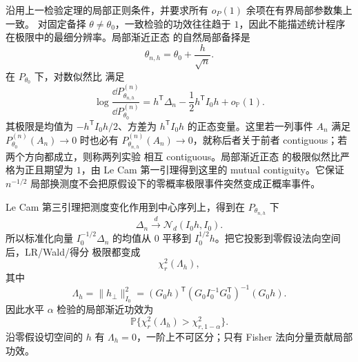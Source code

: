 \begin{proposition}[局部备择的非中心卡方与功效]
沿用上一检验定理的局部正则条件，并要求所有 $o_P(1)$ 余项在有界局部参数集上一致。
对固定备择 $\theta\ne\theta_0$，一致检验的功效往往趋于 $1$，因此不能描述统计程序在极限中的最细分辨率。局部渐近正态 的自然局部备择是
\[
 \theta_{n,h}
 =\theta_0+\frac h{\sqrt n}.
\]
在 $P_{\theta_0}$ 下，对数似然比 满足
\[
 \log\frac{\dd P_{\theta_{n,h}}^{(n)}}
 {\dd P_{\theta_0}^{(n)}}
 =h^{\mathsf T}\Delta_n
 -\frac12h^{\mathsf T}I_0h
 +o_{\mathbb P}(1).
\]
其极限是均值为 $-h^{\mathsf T}I_0h/2$、方差为 $h^{\mathsf T}I_0h$ 的正态变量。这里若一列事件 $A_n$ 满足 $P_{\theta_0}^{(n)}(A_n)\to0$ 时也必有 $P_{\theta_{n,h}}^{(n)}(A_n)\to0$，就称后者关于前者 contiguous；若两个方向都成立，则称两列实验 相互 contiguous。局部渐近正态 的极限似然比严格为正且期望为 $1$，由 Le Cam 第一引理得到这里的 mutual contiguity。它保证 $n^{-1/2}$ 局部换测度不会把原假设下的零概率极限事件突然变成正概率事件。

Le Cam 第三引理把测度变化作用到中心序列上，得到在 $P_{\theta_{n,h}}$ 下
\begin{equation}\label{eq:math-stat-third-lemma-shift}
 \Delta_n
 \xrightarrow{d}\mathcal N_d(I_0h,I_0).
\end{equation}
所以标准化向量 $I_0^{-1/2}\Delta_n$ 的均值从 $0$ 平移到 $I_0^{1/2}h$。把它投影到零假设法向空间后，LR/Wald/得分 极限都变成
\[
 \chi^2_r(\Lambda_h),
\]
其中
\begin{equation*}\Lambda_h
 =\|h_\perp\|_{I_0}^2
 =(G_0h)^{\mathsf T}
 (G_0I_0^{-1}G_0^{\mathsf T})^{-1}
 (G_0h).
\end{equation*}
因此水平 $\alpha$ 检验的局部渐近功效为
\[
 \mathbb P\{\chi^2_r(\Lambda_h)>\chi^2_{r,1-\alpha}\}.
\]
沿零假设切空间的 $h$ 有 $\Lambda_h=0$，一阶上不可区分；只有 Fisher 法向分量贡献局部功效。
\end{proposition}


